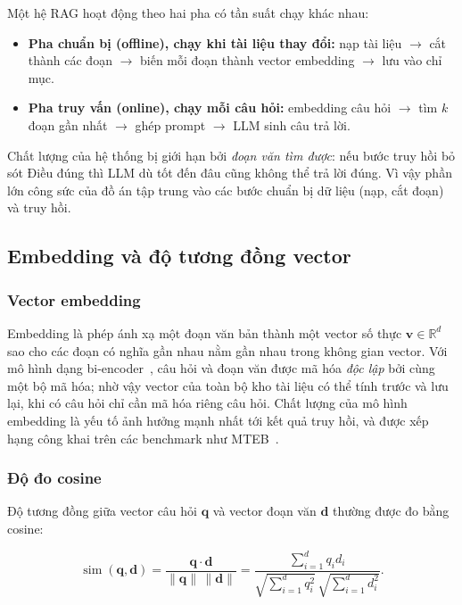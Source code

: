Một hệ RAG hoạt động theo hai pha có tần suất chạy khác nhau:

\begin{itemize}
  \item \textbf{Pha chuẩn bị (offline), chạy khi tài liệu thay đổi:} nạp tài liệu $\rightarrow$ cắt thành các đoạn $\rightarrow$ biến mỗi đoạn thành vector embedding $\rightarrow$ lưu vào chỉ mục.
  \item \textbf{Pha truy vấn (online), chạy mỗi câu hỏi:} embedding câu hỏi $\rightarrow$ tìm $k$ đoạn gần nhất $\rightarrow$ ghép prompt $\rightarrow$ LLM sinh câu trả lời.
\end{itemize}

Chất lượng của hệ thống bị giới hạn bởi \emph{đoạn văn tìm được}: nếu bước truy hồi bỏ sót Điều đúng thì LLM dù tốt đến đâu cũng không thể trả lời đúng. Vì vậy phần lớn công sức của đồ án tập trung vào các bước chuẩn bị dữ liệu (nạp, cắt đoạn) và truy hồi.

\subsection{Embedding và độ tương đồng vector}

\subsubsection{Vector embedding}

Embedding là phép ánh xạ một đoạn văn bản thành một vector số thực $\mathbf{v} \in \mathbb{R}^d$ sao cho các đoạn có nghĩa gần nhau nằm gần nhau trong không gian vector. Với mô hình dạng bi-encoder~\cite{reimers2019sentencebert}, câu hỏi và đoạn văn được mã hóa \emph{độc lập} bởi cùng một bộ mã hóa; nhờ vậy vector của toàn bộ kho tài liệu có thể tính trước và lưu lại, khi có câu hỏi chỉ cần mã hóa riêng câu hỏi. Chất lượng của mô hình embedding là yếu tố ảnh hưởng mạnh nhất tới kết quả truy hồi, và được xếp hạng công khai trên các benchmark như MTEB~\cite{muennighoff2022mteb}.

\subsubsection{Độ đo cosine}

Độ tương đồng giữa vector câu hỏi $\mathbf{q}$ và vector đoạn văn $\mathbf{d}$ thường được đo bằng cosine:

\begin{equation}
  \operatorname{sim}(\mathbf{q}, \mathbf{d})
  = \frac{\mathbf{q}\cdot\mathbf{d}}{\lVert\mathbf{q}\rVert\,\lVert\mathbf{d}\rVert}
  = \frac{\sum_{i=1}^{d} q_i d_i}{\sqrt{\sum_{i=1}^{d} q_i^2}\,\sqrt{\sum_{i=1}^{d} d_i^2}} .
\end{equation}

